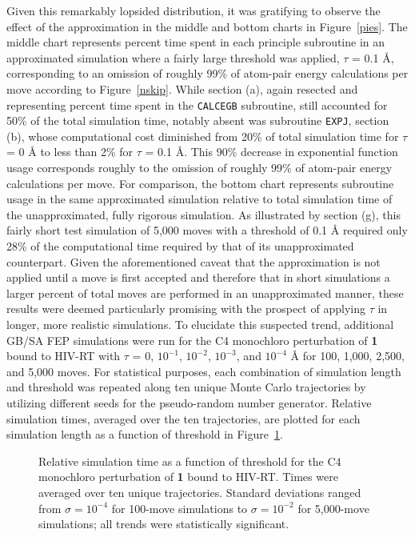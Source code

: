 \documentclass[12pt]{report}
\def\figlab{Figure}\def\figslab{\figlab s}
\newcommand*\fig[1]{\figlab~\ref{#1}}
\begin{document}
Given this remarkably lopsided distribution, it was gratifying to observe the effect of the approximation in the middle and bottom charts in \fig{pies}. The middle chart represents percent time spent in each principle subroutine in an approximated simulation where a fairly large threshold was applied, $\tau$ = 0.1 \AA, corresponding to an omission of roughly 99\% of atom-pair energy calculations per move according to \fig{nskip}. While section (a), again resected and representing percent time spent in the {\tt CALCEGB} subroutine, still accounted for 50\% of the total simulation time, notably absent was subroutine {\tt EXPJ}, section (b), whose computational cost diminished from 20\% of total simulation time for $\tau$ = 0 \AA{} to less than 2\% for $\tau$ = 0.1 \AA. This 90\% decrease in exponential function usage corresponds roughly to the omission of roughly 99\% of atom-pair energy calculations per move. For comparison, the bottom chart represents subroutine usage in the same approximated simulation relative to total simulation time of the unapproximated, fully rigorous simulation. As illustrated by section (g), this fairly short test simulation of 5,000 moves with a threshold of 0.1 \AA{} required only 28\% of the computational time required by that of its unapproximated counterpart. Given the aforementioned caveat that the approximation is not applied until a move is first accepted and therefore that in short simulations a larger percent of total moves are performed in an unapproximated manner, these results were deemed particularly promising with the prospect of applying $\tau$ in longer, more realistic simulations. To elucidate this suspected trend, additional GB/SA FEP simulations were run for the C4 monochloro perturbation of \textbf{1} bound to HIV-RT with $\tau$ = 0, $10^{-1}$, $10^{-2}$, $10^{-3}$, and $10^{-4}$ \AA{} for 100, 1,000, 2,500, and 5,000 moves. For statistical purposes, each combination of simulation length and threshold was repeated along ten unique Monte Carlo trajectories by utilizing different seeds for the pseudo-random number generator. Relative simulation times, averaged over the ten trajectories, are plotted for each simulation length as a function of threshold in \fig{speedup}.

\begin{figure}[t]
\centering

\caption{Relative simulation time as a function of threshold for the C4 monochloro perturbation of \textbf{1} bound to HIV-RT. Times were averaged over ten unique trajectories. Standard deviations ranged from $\sigma = 10^{-4}$ for 100-move simulations to $\sigma = 10^{-2}$ for 5,000-move simulations; all trends were statistically significant.}
\label{speedup}
\end{figure}
\end{document}
